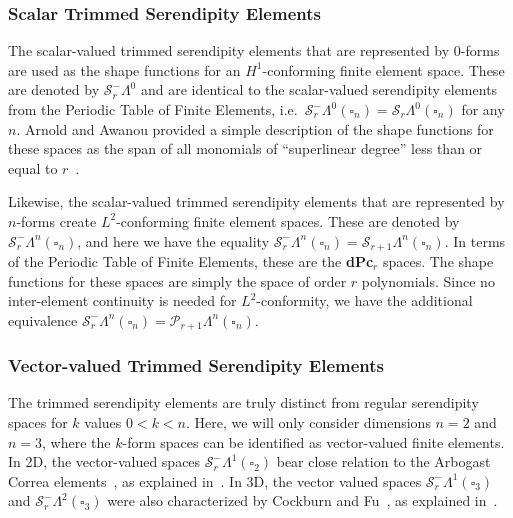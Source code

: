 \documentclass[format=acmsmall,screen,timestamp=false,a4paper]{acmart}
\newcommand{\calP}{\mathcal{P}}
\newcommand{\calS}{\mathcal{S}}
\begin{document}
  
  \subsubsection{Scalar Trimmed Serendipity Elements}
  The scalar-valued trimmed serendipity elements that are represented by $0$-forms are used as the shape functions for an $H^1$-conforming finite element space.  These are denoted by $\calS_r^-\Lambda^0$ and are identical to the scalar-valued serendipity elements from the Periodic Table of Finite Elements, i.e.\ $\calS_r^-\Lambda^0(\square_n) = \calS_r\Lambda^0(\square_n)$ for any $n$.  Arnold and Awanou provided a simple description of the shape functions for these spaces as the span of all monomials of ``superlinear degree'' less than or equal to $r$~\cite{arnold2011serendipity}. 
  
  Likewise, the scalar-valued trimmed serendipity elements that are represented by $n$-forms create $L^2$-conforming finite element spaces.  These are denoted by $\calS_r^-\Lambda^n(\square_n)$, and here we have the equality $\calS_r^-\Lambda^n(\square_n) = \calS_{r+1}\Lambda^n(\square_n)$.  In terms of the Periodic Table of Finite Elements, these are the \textbf{dPc}$_r$ spaces.  The shape functions for these spaces are simply the space of order $r$ polynomials.  Since no inter-element continuity is needed for $L^2$-conformity, we have the additional equivalence $\calS_r^-\Lambda^n(\square_n) = \calP_{r+1}\Lambda^n(\square_n)$.
  
  \subsubsection{Vector-valued Trimmed Serendipity Elements}
  

	The trimmed serendipity elements are truly distinct from regular serendipity spaces for $k$ values $0<k<n$.  Here, we will only consider dimensions $n=2$ and $n=3$, where the $k$-form spaces can be identified as vector-valued finite elements.  	
	In 2D, the vector-valued spaces $\calS_r^-\Lambda^1(\square_2)$ bear close relation to the Arbogast Correa elements~\cite{arbogast2016two}, as explained in~\cite[Prop 2.2]{gillette2019trimmed}.
	In 3D, the vector valued spaces $\calS_r^-\Lambda^1(\square_3)$ and $\calS_r^-\Lambda^2(\square_3)$ were also characterized by Cockburn and Fu~\cite{CF2016}, as explained in~\cite[Prop 2.3]{gillette2019trimmed}.
\end{document}
